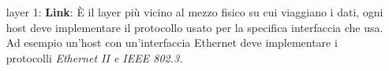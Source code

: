 \begin{enumerate}

    \item[layer 1:] \textbf{Link}: È il layer più vicino al mezzo fisico su cui viaggiano i dati, ogni host deve implementare il protocollo usato per la specifica interfaccia che usa. Ad esempio un'host con un'interfaccia Ethernet deve implementare i protocolli \it{Ethernet II} e \it{IEEE 802.3}.

\end{enumerate}

